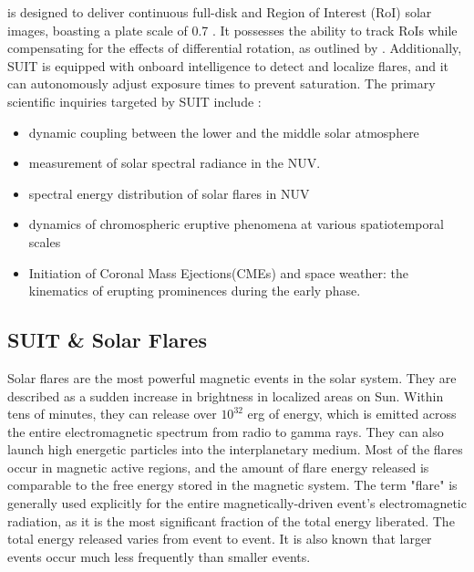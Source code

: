 {{\suit} is designed to deliver continuous full-disk and Region of Interest (RoI) solar images, boasting a plate scale of 0.7 \arcsec. It possesses the ability to track RoIs while compensating for the effects of differential rotation, as outlined by \cite{suit_algo}. Additionally, SUIT is equipped with onboard intelligence to detect and localize flares, and it can autonomously adjust exposure times to prevent saturation. The primary scientific inquiries targeted by SUIT include \citep{suit_science, suit_main}:

\begin{itemize}
    \item dynamic coupling between the lower and the middle solar atmosphere
    \item measurement of solar spectral radiance in the NUV.
    \item spectral energy distribution of solar flares in NUV
    \item dynamics of chromospheric eruptive phenomena at various spatiotemporal scales
    \item Initiation of Coronal Mass Ejections(CMEs) and space weather: the kinematics of erupting prominences during the early phase.
\end{itemize}

\subsection{SUIT \& Solar Flares}\label{sec:suit_and_flare}

Solar flares are the most powerful magnetic events in the solar system. They are described as a sudden increase in brightness in localized areas on Sun. Within tens of minutes, they can release over $10^{32}$ erg of energy, which is emitted across the entire electromagnetic spectrum from radio to gamma rays. They can also launch high energetic particles into the interplanetary medium. Most of the flares occur in magnetic active regions, and the amount of flare energy released is comparable to the free energy stored in the magnetic system. The term "flare" is generally used explicitly for the entire magnetically-driven event's electromagnetic radiation, as it is the most significant fraction of the total energy liberated. The total energy released varies from event to event. It is also known that larger events occur much less frequently than smaller events.

}
